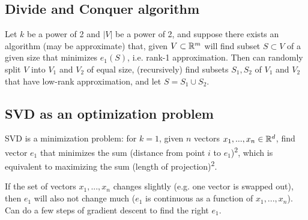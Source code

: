 \documentclass{article}
\begin{document}
\subsection{Divide and Conquer algorithm}
Let $k$ be a power of 2 and $|V|$ be a power of 2, and suppose there exists an algorithm (may be approximate) that, given $V\subset \mathbb{R}^m$ will find subset $S\subset V$ of a given size that minimizes $e_1(S)$, i.e. rank-1 approximation. Then can randomly split $V$ into $V_1$ and $V_2$ of equal size, (recursively) find subsets $S_1,S_2$ of $V_1$ and $V_2$ that have low-rank approximation, and let $S = S_1\cup S_2$.

\subsection{SVD as an optimization problem}
SVD is a minimization problem: for $k=1$, given $n$ vectors $x_1,...,x_n\in \mathbb{R}^d$, find vector $e_1$ that minimizes the sum (distance from point $i$ to $e_1$)\textsuperscript{2}, which is equivalent to maximizing the sum (length of projection)\textsuperscript{2}.

If the set of vectors $x_1,...,x_n$ changes slightly (e.g. one vector is swapped out), then $e_1$ will also not change much ($e_1$ is continuous as a function of $x_1,...,x_n$). Can do a few steps of gradient descent to find the right $e_1$.
\end{document}
